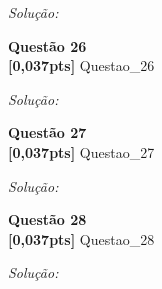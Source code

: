 \documentclass{article}
\newenvironment{problem}[2][Questão]
    { \begin{mdframed}[backgroundcolor=gray!20] \textbf{#1 #2} \\}
    {  \end{mdframed}}
\newenvironment{solution}
    {\textit{Solução:}}
    {}
\begin{document}
\begin{solution}


\end{solution}

\begin{problem}{26}
\textbf{[0,037pts]} Questao\_26
\end{problem}

\begin{solution}


\end{solution}

\begin{problem}{27}
\textbf{[0,037pts]} Questao\_27
\end{problem}

\begin{solution}


\end{solution}

\begin{problem}{28}
\textbf{[0,037pts]} Questao\_28
\end{problem}

\begin{solution}


\end{solution}
\end{document}
